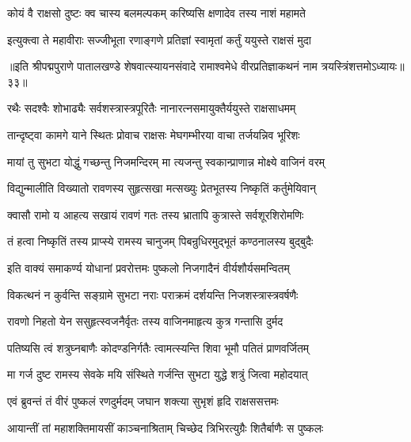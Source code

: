 \twolineshloka
{कोयं वै राक्षसो दुष्टः क्व चास्य बलमल्पकम्}
{करिष्यसि क्षणादेव तस्य नाशं महामते}%

\twolineshloka
{इत्युक्त्वा ते महावीराः सज्जीभूता रणाङ्गणे}
{प्रतिज्ञां स्वामृतां कर्तुं ययुस्ते राक्षसं मुदा}%

{॥इति श्रीपद्मपुराणे पातालखण्डे शेषवात्स्यायनसंवादे रामाश्वमेधे वीरप्रतिज्ञाकथनं नाम त्रयस्त्रिंशत्तमोऽध्यायः॥३३॥}

\resetShloka


\twolineshloka
{रथैः सदश्वैः शोभाढ्यैः सर्वशस्त्रास्त्रपूरितैः}
{नानारत्नसमायुक्तैर्ययुस्ते राक्षसाधमम्}%

\twolineshloka
{तान्दृष्ट्वा कामगे याने स्थितः प्रोवाच राक्षसः}
{मेघगम्भीरया वाचा तर्जयन्निव भूरिशः}%

\twolineshloka
{मायां तु सुभटा योद्धुं गच्छन्तु निजमन्दिरम्}
{मा त्यजन्तु स्वकान्प्राणान्न मोक्ष्ये वाजिनं वरम्}%

\twolineshloka
{विद्युन्मालीति विख्यातो रावणस्य सुहृत्सखा}
{मत्सख्युः प्रेतभूतस्य निष्कृतिं कर्तुमेयिवान्}%

\twolineshloka
{क्वासौ रामो य आहत्य सखायं रावणं गतः}
{तस्य भ्रातापि कुत्रास्ते सर्वशूरशिरोमणिः}%

\twolineshloka
{तं हत्वा निष्कृतिं तस्य प्राप्स्ये रामस्य चानुजम्}
{पिबन्रुधिरमुद्भूतं कण्ठनालस्य बुद्बुदैः}%

\twolineshloka
{इति वाक्यं समाकर्ण्य योधानां प्रवरोत्तमः}
{पुष्कलो निजगादैनं वीर्यशौर्यसमन्वितम्}%


\twolineshloka
{विकत्थनं न कुर्वन्ति सङ्ग्रामे सुभटा नराः}
{पराक्रमं दर्शयन्ति निजशस्त्रास्त्रवर्षणैः}%

\twolineshloka
{रावणो निहतो येन ससुहृत्स्वजनैर्वृतः}
{तस्य वाजिनमाहृत्य कुत्र गन्तासि दुर्मद}%

\twolineshloka
{पतिष्यसि त्वं शत्रुघ्नबाणैः कोदण्डनिर्गतैः}
{त्वामत्स्यन्ति शिवा भूमौ पतितं प्राणवर्जितम्}%

\twolineshloka
{मा गर्ज दुष्ट रामस्य सेवके मयि संस्थिते}
{गर्जन्ति सुभटा युद्धे शत्रुं जित्वा महोदयात्}%


\twolineshloka
{एवं ब्रुवन्तं तं वीरं पुष्कलं रणदुर्मदम्}
{जघान शक्त्या सुभृशं हृदि राक्षससत्तमः}%

\twolineshloka
{आयान्तीं तां महाशक्तिमायसीं काञ्चनाश्रिताम्}
{चिच्छेद त्रिभिरत्युग्रैः शितैर्बाणैः स पुष्कलः}%

